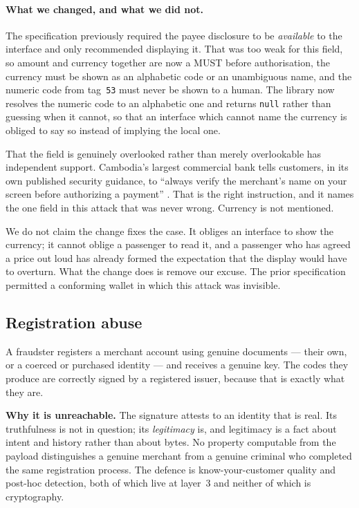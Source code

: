 \documentclass[10pt,a4paper,twocolumn]{article}
\begin{document}
\paragraph{What we changed, and what we did not.} The specification previously
required the payee disclosure to be \emph{available} to the interface and only
recommended displaying it. That was too weak for this field, so amount and
currency together are now a MUST before authorisation, the currency must be
shown as an alphabetic code or an unambiguous name, and the numeric code from
tag~\texttt{53} must never be shown to a human. The library now resolves the
numeric code to an alphabetic one and returns \texttt{null} rather than guessing
when it cannot, so that an interface which cannot name the currency is obliged
to say so instead of implying the local one.

That the field is genuinely overlooked rather than merely overlookable has
independent support. Cambodia's largest commercial bank tells customers, in its
own published security guidance, to ``always verify the merchant's name on your
screen before authorizing a payment'' \citep{acleda2026tips}. That is the right
instruction, and it names the one field in this attack that was never wrong.
Currency is not mentioned.

We do not claim the change fixes the case. It obliges an interface to show the
currency; it cannot oblige a passenger to read it, and a passenger who has
agreed a price out loud has already formed the expectation that the display
would have to overturn. What the change does is remove our excuse. The prior
specification permitted a conforming wallet in which this attack was invisible.

\subsection{Registration abuse}
\label{sec:registration}

A fraudster registers a merchant account using genuine documents --- their own, or
a coerced or purchased identity --- and receives a genuine key. The codes they
produce are correctly signed by a registered issuer, because that is exactly
what they are.

\textbf{Why it is unreachable.} The signature attests to an identity that is
real. Its truthfulness is not in question; its \emph{legitimacy} is, and
legitimacy is a fact about intent and history rather than about bytes. No
property computable from the payload distinguishes a genuine merchant from a
genuine criminal who completed the same registration process. The defence is
know-your-customer quality and post-hoc detection, both of which live at layer~3
and neither of which is cryptography.
\end{document}

